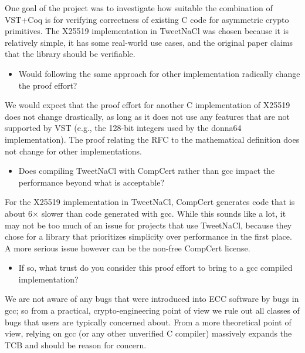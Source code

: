 \begin{answer}
  One goal of the project was to investigate how suitable the combination of
  VST+Coq is for verifying correctness of existing C code for asymmetric
  crypto primitives. The X25519 implementation in TweetNaCl was chosen because
  it is relatively simple, it has some real-world use cases, and the original
  paper claims that the library should be verifiable.
\end{answer}

\begin{itemize}
  \item Would following the same approach for other implementation radically change the proof effort?
\end{itemize}

\begin{answer}
  We would expect that the proof effort for another C implementation of X25519
  does not change drastically, as long as it does not use any features that are
  not supported by VST (e.g., the 128-bit integers used by the donna64
  implementation). The proof relating the RFC to the mathematical definition
  does not change for other implementations.
\end{answer}

\begin{itemize}
  \item Does compiling TweetNaCl with CompCert rather than gcc impact the performance beyond what is acceptable?
\end{itemize}

\begin{answer}
  For the X25519 implementation in TweetNaCl, CompCert generates code that is
  about 6$\times$ slower than code generated with gcc. While this sounds like a lot, it
  may not be too much of an issue for projects that use TweetNaCl, because they
  chose for a library that prioritizes simplicity over performance in the first
  place. A more serious issue however can be the non-free CompCert license.
\end{answer}

\begin{itemize}
  \item If so, what trust do you consider this proof effort to bring to a gcc compiled implementation?
\end{itemize}

\begin{answer}
  We are not aware of any bugs that were introduced into ECC software by bugs in
  gcc; so from a practical, crypto-engineering point of view we rule out all
  classes of bugs that users are typically concerned about. From a more
  theoretical point of view, relying on gcc (or any other unverified C compiler)
  massively expands the TCB and should be reason for concern.
\end{answer}
